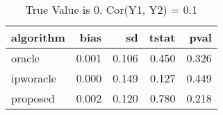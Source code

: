 \begin{table}[h!]
\caption{True Value is 0. Cor(Y1, Y2) = 0.1}
\centering
\begin{tabular}[t]{lrrrr}
\toprule
algorithm & bias & sd & tstat & pval\\
\midrule
oracle & 0.001 & 0.106 & 0.450 & 0.326\\
ipworacle & 0.000 & 0.149 & 0.127 & 0.449\\
proposed & 0.002 & 0.120 & 0.780 & 0.218\\
\bottomrule
\end{tabular}
\end{table}
